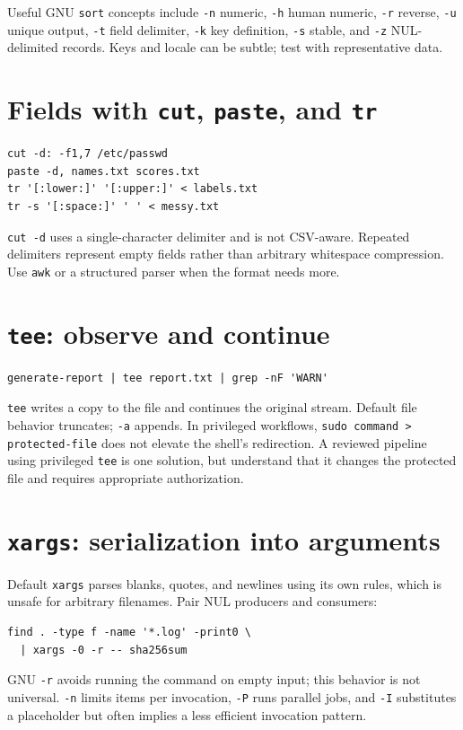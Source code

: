 \documentclass[11pt,oneside,openany]{book}
\begin{document}
Useful GNU \texttt{sort} concepts include \texttt{-n} numeric, \texttt{-h} human numeric, \texttt{-r} reverse, \texttt{-u} unique output, \texttt{-t} field delimiter, \texttt{-k} key definition, \texttt{-s} stable, and \texttt{-z} NUL-delimited records. Keys and locale can be subtle; test with representative data.

\section{Fields with \texttt{cut}, \texttt{paste}, and \texttt{tr}}
\begin{lstlisting}
cut -d: -f1,7 /etc/passwd
paste -d, names.txt scores.txt
tr '[:lower:]' '[:upper:]' < labels.txt
tr -s '[:space:]' ' ' < messy.txt
\end{lstlisting}
\texttt{cut -d} uses a single-character delimiter and is not CSV-aware. Repeated delimiters represent empty fields rather than arbitrary whitespace compression. Use \texttt{awk} or a structured parser when the format needs more.

\section{\texttt{tee}: observe and continue}
\begin{lstlisting}
generate-report | tee report.txt | grep -nF 'WARN'
\end{lstlisting}
\texttt{tee} writes a copy to the file and continues the original stream. Default file behavior truncates; \texttt{-a} appends. In privileged workflows, \texttt{sudo command > protected-file} does not elevate the shell's redirection. A reviewed pipeline using privileged \texttt{tee} is one solution, but understand that it changes the protected file and requires appropriate authorization.

\section{\texttt{xargs}: serialization into arguments}
Default \texttt{xargs} parses blanks, quotes, and newlines using its own rules, which is unsafe for arbitrary filenames. Pair NUL producers and consumers:
\begin{lstlisting}
find . -type f -name '*.log' -print0 \
  | xargs -0 -r -- sha256sum
\end{lstlisting}
GNU \texttt{-r} avoids running the command on empty input; this behavior is not universal. \texttt{-n} limits items per invocation, \texttt{-P} runs parallel jobs, and \texttt{-I} substitutes a placeholder but often implies a less efficient invocation pattern.
\end{document}
